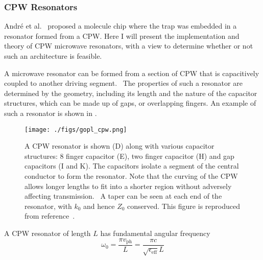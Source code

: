 \subsubsection{CPW Resonators}
\label{experiment:mw:resonator}

Andr\'e et al.~\cite{Andre2006} proposed a molecule chip where the trap was
embedded in a resonator formed from a CPW. Here I will present
the implementation and theory of CPW microwave resonators, with a view to
determine whether or not such an architecture is feasible.

A microwave resonator can be formed from a section of CPW that is capacitively
coupled to another driving segment.~\cite{Day2003} The properties of such a
resonator are determined by the geometry, including its length and the nature
of the capacitor structures, which can be made up of gaps, or overlapping
fingers. An example of such a resonator is shown in
.~\cite{doi:10.1063/1.3010859, Pain1999}

\begin{figure}
  \texttt{[image: ./figs/gopl\_cpw.png]}
  \caption{
    A CPW resonator is shown (D) along with various capacitor structures: 8
    finger capacitor (E), two finger capacitor (H) and gap capacitors (I and K).
    The capacitors isolate a segment of the central conductor to form the
    resonator. Note that the curving of the CPW allows longer lengths to fit
    into a shorter region without adversely affecting
    transmission.~\cite{Simons2004} A taper can be seen at each end of the
    resonator, with $k_0$ and hence $Z_0$ conserved.
    This figure is reproduced from reference~\cite{doi:10.1063/1.3010859}.
  }
  \label{experiment:fig:resonator}
\end{figure}

A CPW resonator of length $L$ has fundamental angular frequency
\begin{equation}
  \omega_0 = \frac{\pi v_\mathrm{ph}}{L} = \frac{\pi
  c}{\sqrt{\epsilon_\text{eff}} L}
\end{equation}

